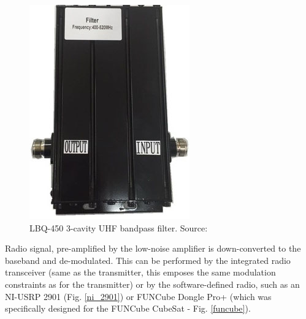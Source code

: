\begin{minipage}{\linewidth}
\begin{minipage}{0.45\linewidth}
\begin{figure}[H]
            \includegraphics[width=0.2\paperwidth]{img/1/cavity_uhf.jpg}
            \caption{LBQ-450 3-cavity UHF bandpass filter. Source: \cite{cavity_uhf}}
            \label{cavity_uhf}
        \end{figure}
    \end{minipage}
\end{minipage}

Radio signal, pre-amplified by the low-noise amplifier is down-converted to the baseband and de-modulated. This can be performed by the integrated radio transceiver (same as the transmitter, this emposes the same modulation constraints as for the transmitter) or by the software-defined radio, such as an NI-USRP 2901 (Fig. \ref{ni_2901}) or FUNCube Dongle Pro+ (which was specifically designed for the FUNCube CubeSat - Fig. \ref{funcube}).

